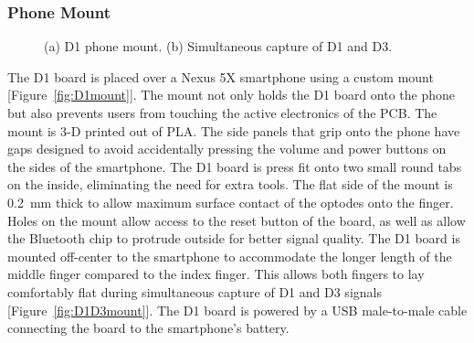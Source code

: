 \subsubsection{Phone Mount}
\begin{figure}
    \begin{center}
    \end{center}
    \caption{(a) D1 phone mount. (b) Simultaneous capture of D1 and D3.} 
    \label{fig:D1hardware}
\end{figure} 
The D1 board is placed over a Nexus 5X smartphone using a custom mount [Figure~\ref{fig:D1mount}]. The mount not only holds the D1 board onto the phone but also prevents users from touching the active electronics of the \ac{PCB}. The mount is 3-D printed out of \ac{PLA}. The side panels that grip onto the phone have gaps designed to avoid accidentally pressing the volume and power buttons on the sides of the smartphone. The D1 board is press fit onto two small round tabs on the inside, eliminating the need for extra tools. The flat side of the mount is 0.2~mm thick to allow maximum surface contact of the optodes onto the finger. Holes on the mount allow access to the reset button of the board, as well as allow the Bluetooth chip to protrude outside for better signal quality. The D1 board is mounted off-center to the smartphone to accommodate the longer length of the middle finger compared to the index finger. This allows both fingers to lay comfortably flat during simultaneous capture of D1 and D3 signals [Figure~\ref{fig:D1D3mount}]. The D1 board is powered by a USB male-to-male cable connecting the board to the smartphone's battery. 


